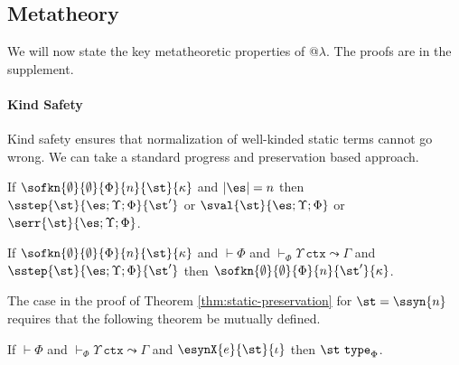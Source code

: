 

\subsection{Metatheory}\label{metatheory}
\noindent We will now state the key metatheoretic properties of @$\lambda$. The proofs are in the supplement. 

\paragraph{Kind Safety} Kind safety ensures that normalization of well-kinded static terms cannot go wrong. We can take a standard progress and preservation based approach. 
\begin{theorem}\label{thm:static-progress}
If $\sofkn{\emptyset}{\emptyset}{\Phi}{n}{\st}{\kappa}$ and $|\es|=n$ then $\sstep{\st}{\es; \Upsilon; \Phi}{\st'}$ or $\sval{\st}{\es; \Upsilon; \Phi}$ or $\serr{\st}{\es; \Upsilon; \Phi}$.
\end{theorem}

\begin{theorem}\label{thm:static-preservation}
If $\sofkn{\emptyset}{\emptyset}{\Phi}{n}{\st}{\kappa}$ and $\vdash \Phi$ and $\vdash_\Phi \Upsilon~\mathtt{ctx} \leadsto \Gamma$ and $\sstep{\st}{\es; \Upsilon; \Phi}{\st'}$ then $\sofkn{\emptyset}{\emptyset}{\Phi}{n}{\st'}{\kappa}$.
\end{theorem}\noindent
The case in the proof of Theorem \ref{thm:static-preservation} for $\st=\ssyn{n}$ requires that the following theorem be mutually defined. %
\begin{theorem}
If $\vdash \Phi$ and $\vdash_\Phi \Upsilon~\mathtt{ctx} \leadsto \Gamma$ and $\esynX{e}{\st}{\iota}$ then $\st~\mathtt{type}_\Phi$. 
\end{theorem}

